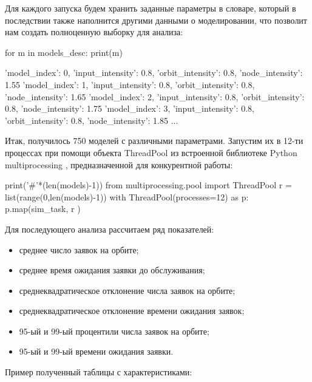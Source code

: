 Для каждого запуска будем хранить заданные параметры в словаре, который в последствии также наполнится другими данными о моделировании, что позволит нам создать полноценную выборку для анализа:

\begin{pyin}
for m in models_desc:
   print(m)
\end{pyin}

\begin{pyprint}
{'model_index': 0, 'input_intensity': 0.8, 'orbit_intensity': 0.8, 'node_intensity': 1.55}
{'model_index': 1, 'input_intensity': 0.8, 'orbit_intensity': 0.8, 'node_intensity': 1.65}
{'model_index': 2, 'input_intensity': 0.8, 'orbit_intensity': 0.8, 'node_intensity': 1.75}
{'model_index': 3, 'input_intensity': 0.8, 'orbit_intensity': 0.8, 'node_intensity': 1.85}
...
\end{pyprint}

Итак, получилось 750 моделей с различными параметрами. Запустим их в 12-ти процессах при помощи объекта ThreadPool из встроенной библиотеке Python multiprocessing \cite{multiproc}, предназначенной для конкурентной работы:
\begin{pyin}
print('#'*(len(models)-1))
from multiprocessing.pool import ThreadPool
r = list(range(0,len(models)-1))
with  ThreadPool(processes=12) as p:
   p.map(sim_task, r )
\end{pyin}

Для последующего анализа рассчитаем ряд показателей:
\begin{itemize}
	\item среднее число заявок на орбите;
	\item среднее время ожидания заявки до обслуживания;
	\item среднеквадратическое отклонение числа заявок на орбите;
	\item среднеквадратическое отклонение времени ожидания заявок;
	\item 95-ый и 99-ый процентили числа заявок на орбите;
	\item 95-ый и 99-ый времени ожидания заявки.
\end{itemize}

Пример полученный таблицы с характеристиками:

